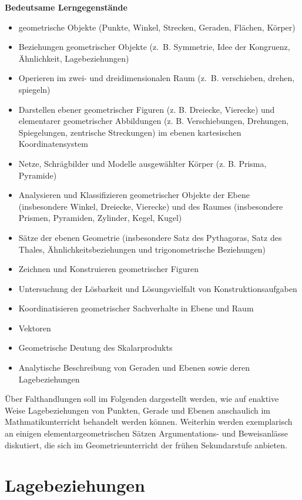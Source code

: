 \documentclass[
]{scrbook}
\providecommand{\tightlist}{%
  \setlength{\itemsep}{0pt}\setlength{\parskip}{0pt}}
\renewenvironment{quote}{
  \list{}{
	\leftmargin0.2cm   %
    \rightmargin\leftmargin
      	\def\FrameCommand
    {%
        {\color{quoteColor}\vrule width 2pt}%
        \hspace{0pt}%
    }%
    \MakeFramed{\advance \hsize -\width \FrameRestore}    \color{quoteColor}
    }
  \item\relax
}
{\endlist\color{black}\endMakeFramed}
\theoremstyle{definition}
\theoremstyle{definition}
\theoremstyle{definition}
\theoremstyle{definition}
\theoremstyle{remark}
\begin{document}
\begin{quote}
\textbf{Bedeutsame Lerngegenstände}

\begin{itemize}
\tightlist
\item
  geometrische Objekte (Punkte, Winkel, Strecken, Geraden, Flächen, Körper)
\item
  Beziehungen geometrischer Objekte (z.~B. Symmetrie, Idee der Kongruenz, Ähnlichkeit, Lagebeziehungen)
\item
  Operieren im zwei- und dreidimensionalen Raum (z.~B. verschieben, drehen, spiegeln)
\item
  Darstellen ebener geometrischer Figuren (z. B. Dreiecke, Vierecke) und elementarer geometrischer Abbildungen (z. B. Verschiebungen, Drehungen, Spiegelungen, zentrische Streckungen) im ebenen kartesischen Koordinatensystem
\item
  Netze, Schrägbilder und Modelle ausgewählter Körper (z. B. Prisma, Pyramide)
\item
  Analysieren und Klassifizieren geometrischer Objekte der Ebene (insbesondere Winkel, Dreiecke, Vierecke) und des Raumes (insbesondere Prismen, Pyramiden, Zylinder, Kegel, Kugel)
\item
  Sätze der ebenen Geometrie (insbesondere Satz des Pythagoras, Satz des Thales, Ähnlichkeitsbeziehungen und trigonometrische Beziehungen)
\item
  Zeichnen und Konstruieren geometrischer Figuren
\item
  Untersuchung der Lösbarkeit und Lösungsvielfalt von Konstruktionsaufgaben
\item
  Koordinatisieren geometrischer Sachverhalte in Ebene und Raum
\item
  Vektoren
\item
  Geometrische Deutung des Skalarprodukts
\item
  Analytische Beschreibung von Geraden und Ebenen sowie deren Lagebeziehungen
\end{itemize}
\end{quote}

Über Falthandlungen soll im Folgenden dargestellt werden, wie auf enaktive Weise Lagebeziehungen von Punkten, Gerade und Ebenen anschaulich im Mathmatikunterricht behandelt werden können. Weiterhin werden exemplarisch an einigen elementargeometrischen Sätzen Argumentations- und Beweisanlässe diskutiert, die sich im Geometrieunterricht der frühen Sekundarstufe anbieten.

\hypertarget{lagebeziehungen}{%
\section{Lagebeziehungen}\label{lagebeziehungen}}
\end{document}
